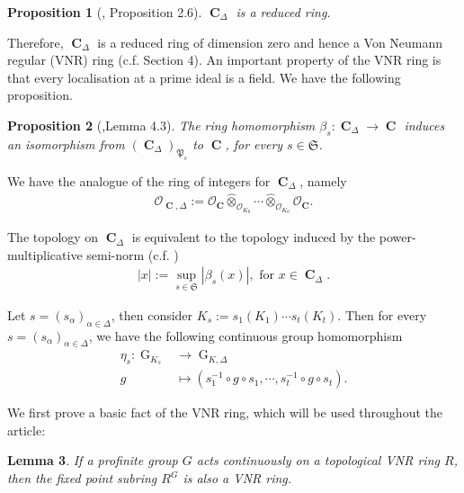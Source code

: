 \documentclass{amsart}
\newtheorem{proposition}{Proposition}[section]
\newtheorem{lemma}[proposition]{Lemma}
\DeclareMathOperator{\C}{\textbf{C}}
\DeclareMathOperator{\G}{G}
\begin{document}
\begin{proposition}[\cite{Pok-Pal}, Proposition 2.6]
    $\C_\Delta$ is a reduced ring.
\end{proposition}

Therefore, $\C_\Delta$ is a reduced ring of dimension zero and hence a Von Neumann regular (VNR) ring (c.f. \cite{Pok-Pal} Section 4). An important property of the VNR ring is that every localisation at a prime ideal is a field. We have the following proposition.

\begin{proposition}[\cite{Pok-Pal},Lemma 4.3]
    The ring homomorphism $\beta_s:\C_\Delta\to \C$ induces an isomorphism from $(\C_\Delta)_{\mathfrak{P}_s}$ to $\C$, for every $s\in\mathfrak{S}$.
\end{proposition}

We have the analogue of the ring of integers for $\C_\Delta$, namely
\begin{align*}
  \mathcal{O}_{\C,\Delta}:=\mathcal{O}_{\C}\hat{\otimes}_{\mathcal{O}_{K_0}}\cdots\hat{\otimes}_{\mathcal{O}_{K_0}}\mathcal{O}_{\C}.
\end{align*}

The topology on $\C_\Delta$ is equivalent to the topology induced by the power-multiplicative semi-norm (c.f. \cite{Pok-Pal})
\begin{align*}
    |x|:=\sup\limits_{s\in\mathfrak{S}}|\beta_s(x)|, \text{ for } x\in \C_\Delta.
\end{align*}

Let $s=(s_\alpha)_{\alpha\in\Delta}$, then consider $K_s:=s_1(K_1)\cdots s_t(K_t)$. Then for every $s=(s_\alpha)_{\alpha\in\Delta}$, we have the following continuous group homomorphism
\begin{align*}
    \eta_s: \G_{K_s}&\to \G_{K,\Delta}\\
                  g&\mapsto (s^{-1}_1\circ g\circ s_1,\cdots, s^{-1}_t\circ g\circ s_t).
\end{align*}

We first prove a basic fact of the VNR ring, which will be used throughout the article:

\begin{lemma}\label{fixedpointofVNR}
    If a profinite group $G$ acts continuously on a topological VNR ring $R$, then the fixed point subring $R^G$ is also a VNR ring.
\end{lemma}
\end{document}
